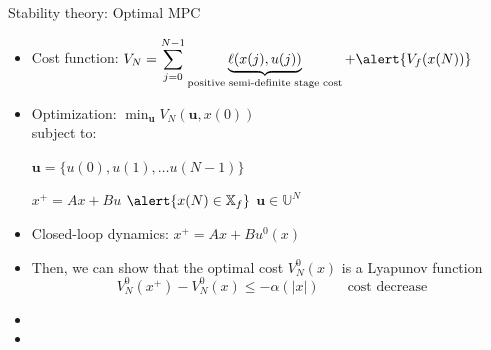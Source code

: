 \documentclass[table]{beamer}
\newcommand\bu {\mathbf{u}}
\newcommand{\norm}[1]{\vert #1 \vert}
\begin{document}
{
\begin{frame}{Stability theory: Optimal MPC}
\begin{itemize} 
\item \alert{Cost function}: \qquad $\displaystyle V_N = \sum_{j=0}^{N-1}
  \underbrace{\ell(x(j), u(j))}_{\text{positive semi-definite stage cost}} + \alert{V_f(x(N))}$
\item \alert{Optimization}: \qquad $\displaystyle \min_{\bu} V_N (\bu,
  x(0)) $\\
subject to: \\
\centerline{$\bu = \{u(0), u(1), \ldots u(N-1)\}$}
\centerline{$x^+=Ax+Bu$ \qquad   $\alert{x(N) \in \mathbb{X}_f}$  \qquad $\bu \in \mathbb{U}^N$} 
\item \alert{Closed-loop dynamics}: $x^+ = Ax+ Bu^0(x)$
\item Then, we can show that the \alert{optimal cost $V_N^0(x)$ is a
  Lyapunov function}
\begin{equation*}
V_N^0(x^+)-V_N^0(x) \leq -\alpha(\norm{x}) \qquad \text{cost decrease}
\end{equation*}
\item {\color{blue}{Terminal region + penalty used to approximate
      infinite horizon cost}}
\item {\color{blue}{Lyapunov theory ensures closed-loop
    stability, asymptotic convergence to origin, and more\ldots}}
\end{itemize}
\end{frame}
}
\end{document}
